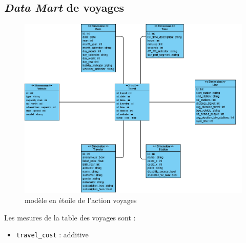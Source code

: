 \documentclass[a4paper,12pt]{report}
\begin{document}
\subsection*{\textit{Data Mart} de \og voyages \fg}
\label{subsec:data_mart_voyages}
\begin{figure}[!ht]
  \centering
  \includegraphics[scale=0.65]{images/voyages_datamart.png}
  \caption{modèle en étoile de l'action \og voyages \fg}
\end{figure}

Les mesures de la table des voyages sont :
\begin{itemize}
  \item \texttt{travel\_cost} : additive
\end{itemize}

\newpage
\end{document}
